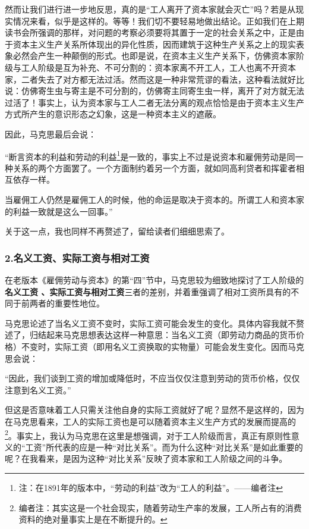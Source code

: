 \documentclass[a4paper,twoside,12pt,AutoFakeBold]{ctexart}
\begin{document}
\vspace{0.5cm} %
然而让我们进行进一步地反思，真的是“工人离开了资本家就会灭亡”吗？若是从现实情况来看，似乎是这样的。等等！我们切不要轻易地做出结论。正如我们在上期读书会所强调的那样，对问题的考察必须要将其置于一定的社会关系之中，正是由于资本主义生产关系所体现出的异化性质，因而建筑于这种生产关系之上的现实表象必然会产生一种颠倒的形式。也即是说，在资本主义生产关系下，仿佛资本家阶级与工人阶级是互为补充、不可分割的：资本家离不开工人，工人也离不开资本家，二者失去了对方都无法过活。然而这是一种非常荒谬的看法，这种看法就好比说：仿佛寄生虫与寄主是不可分割的，仿佛寄主同寄生虫一样，离开了对方就无法过活了！事实上，认为资本家与工人二者无法分离的观点恰恰是由于资本主义生产方式所产生的意识形态之幻象，这是一种资本主义的遮蔽。

因此，马克思最后会说：
\begin{adjustwidth}{2em}{2em}
    \qquad\fangsong
    “断言资本的利益和劳动的利益\footnote{注：在1891年的版本中，“劳动的利益”改为“工人的利益”。——编者注}是一致的，事实上不过是说资本和雇佣劳动是同一种关系的两个方面罢了。一个方面制约着另一个方面，就如同高利贷者和挥霍者相互依存一样。

当雇佣工人仍然是雇佣工人的时候，他的命运是取决于资本的。所谓工人和资本家的利益一致就是这么一回事。”
\end{adjustwidth}
关于这一点，我也同样不再赘述了，留给读者们细细思索了。

\subsubsection{2.名义工资、实际工资与相对工资}
在老版本《雇佣劳动与资本》的第“四”节中，马克思较为细致地探讨了工人阶级的\textbf{名义工资
、实际工资与相对工资}三者的差别，并着重强调了相对工资所具有的不同于前两者的重要性地位。

马克思论述了当名义工资不变时，实际工资可能会发生的变化。具体内容我就不赘述了，归结起来马克思想表达这样一种意思：当名义工资（即劳动力商品的货币价格）不变时，实际工资（即用名义工资换取的实物量）可能会发生变化。因而马克思会说：
\begin{adjustwidth}{2em}{2em}
    \qquad\fangsong
 “因此，我们谈到工资的增加或降低时，不应当仅仅注意到劳动的货币价格，仅仅注意到名义工资。”
\end{adjustwidth}
但这是否意味着工人只需关注他自身的实际工资就好了呢？显然不是这样的，因为在马克思看来，工人的实际工资也是可以随着资本主义生产方式的发展而提高的\footnote{编者注：其实这是一个社会现实，随着劳动生产率的发展，工人所占有的消费资料的绝对量事实上是在不断提升的。}。事实上，我认为马克思在这里是想强调，对于工人阶级而言，真正有原则性意义的“工资”所代表的应是一种“对比关系”。而为什么这种“对比关系”是如此重要的呢？在我看来，是因为这种“对比关系”反映了资本家和工人阶级之间的斗争。
\end{document}
